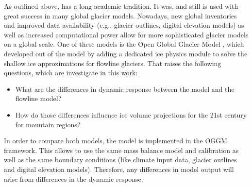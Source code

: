     As outlined above, \vas{} has a long academic tradition. It was, and still is used with great success in many global glacier models. Nowadays, new global inventories and improved data availability (e.g., glacier outlines, digital elevation models) as well as increased computational power allow for more sophisticated glacier models on a global scale. One of these models is the Open Global Glacier Model \citep[OGGM,][]{Maussion2019}, which developed out of the \vas{} model \citep{Marzeion2012b} by adding a dedicated ice physics module to solve the shallow ice approximations for flowline glaciers. That raises the following questions, which are investigate in this work:
    \begin{itemize}
        \item What are the differences in dynamic response between the \vas{} model and the flowline model?
        \item How do those differences influence ice volume projections for the 21st century for mountain regions?
    \end{itemize}
    In order to compare both models, the \vas{} model is implemented in the OGGM framework. This allows to use the same mass balance model and calibration as well as the same boundary conditions (like climate input data, glacier outlines and digital elevation models). Therefore, any differences in model output will arise from differences in the dynamic response.
    
    
